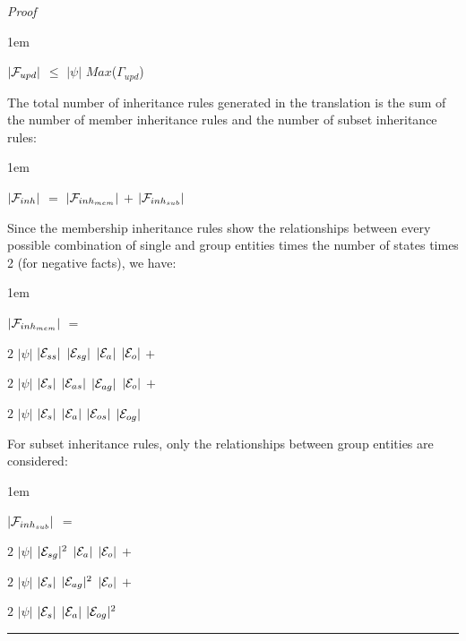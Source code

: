\documentclass[11pt]{report}
\newenvironment{vproof}
{
  \noindent
  {\em Proof}\hspace{0.5em}
}
{

  \noindent
  \rule{0.5em}{0.5em}
}
\newenvironment{vquote}
{
  \begin{list}{}{\leftmargin 1em}\item[]
}
{
  \end{list}
}
\begin{document}
\begin{vproof}
            \begin{vquote}
              $|{\cal F}_{upd}|$ $\leq$ $|\psi|$ $Max$($\Gamma_{upd}$)
            \end{vquote}

            The total number of inheritance rules generated in the translation
            is the sum of the number of member inheritance rules and the number
            of subset inheritance rules:

            \begin{vquote}
              $|{\cal F}_{inh}|$ $=$
                $|{\cal F}_{inh_{mem}}|$ $+$
                $|{\cal F}_{inh_{sub}}|$
            \end{vquote}

            Since the membership inheritance rules show the relationships
            between every possible combination of single and group entities
            times the number of states times 2 (for negative facts), we have:
 
            \begin{vquote}
              $|{\cal F}_{inh_{mem}}|$ $=$
 
              \hspace{1em}
              $2$ $|\psi|$ $|{\cal E}_{ss}|$ $|{\cal E}_{sg}|$ $|{\cal E}_{a}|$ $|{\cal E}_{o}|$ $+$
 
              \hspace{1em}
              $2$ $|\psi|$ $|{\cal E}_{s}|$ $|{\cal E}_{as}|$ $|{\cal E}_{ag}|$ $|{\cal E}_{o}|$ $+$
 
              \hspace{1em}
              $2$ $|\psi|$ $|{\cal E}_{s}|$ $|{\cal E}_{a}|$ $|{\cal E}_{os}|$ $|{\cal E}_{og}|$
            \end{vquote}
 
            For subset inheritance rules, only the relationships between group
            entities are considered:
 
            \begin{vquote}
              $|{\cal F}_{inh_{sub}}|$ $=$
 
              \hspace{1em}
              $2$ $|\psi|$ $|{\cal E}_{sg}|^{2}$ $|{\cal E}_{a}|$ $|{\cal E}_{o}|$ $+$
 
              \hspace{1em}
              $2$ $|\psi|$ $|{\cal E}_{s}|$ $|{\cal E}_{ag}|^{2}$ $|{\cal E}_{o}|$ $+$
 
              \hspace{1em}
              $2$ $|\psi|$ $|{\cal E}_{s}|$ $|{\cal E}_{a}|$ $|{\cal E}_{og}|^{2}$
            \end{vquote}
 

\end{vproof}
\end{document}

